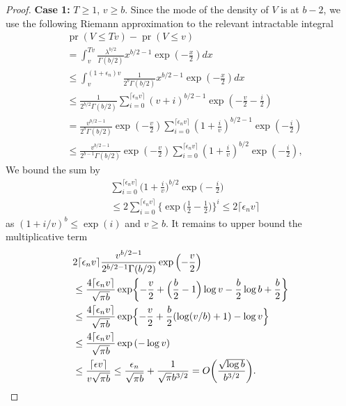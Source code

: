 \documentclass[10pt, reqno]{amsart}
\numberwithin{equation}{section}
\newcommand{\pr}{\mathop{\mathrm{pr}}}
\begin{document}
\begin{appendix}
\begin{proof}
	\noindent    \textbf{Case 1:} $T \geq 1$, $v \geq b$. Since the mode of the density of $V$ is at $b - 2$, we use the following Riemann approximation to the relevant intractable integral
	\begin{align*}
		&\pr\left( V \leq Tv \right) - \pr(V \leq v) 
		\\
		&= \int_{v}^{Tv} \frac{\lambda^{b/2}}{\Gamma(b/2)} x^{b/2-1} \exp\left( -\frac{x}{2} \right) dx    \\
		&\leq \int_{v}^{(1 +\epsilon_n)v} \frac{1}{2^b\Gamma(b/2)} x^{b/2-1} \exp\left( -\frac{x}{2} \right) dx\\
		&\leq \frac{1}{2^{b/2}\Gamma(b/2)} \sum^{ \lceil \epsilon_n v \rceil}_{  i = 0}  (v+i )^{b/2-1} \exp\left( -\frac{ v }{2} - \frac{i}{2} \right)\\
		&= \frac{v^{b/2-1}}{2^b\Gamma(b/2)} \exp\left( -\frac{ v }{2} \right) \sum^{ \lceil \epsilon_n v \rceil}_{  i = 0}  \left(1+ \frac{i}{v} \right)^{b/2-1} \exp\left(- \frac{i}{2} \right) \\
		&\leq \frac{v^{b/2-1}}{2^{b-1}\Gamma(b/2)} \exp\left( -\frac{ v }{2} \right) \sum^{ \lceil \epsilon_n v \rceil}_{  i = 0}  \left(1+ \frac{i}{v} \right)^{b/2} \exp\left(- \frac{i}{2} \right), 
	\end{align*}
	We bound the sum by
	\begin{align*}
		&\sum^{\lceil \epsilon_n v \rceil}_{  i = 0}  \biggl(1+ \frac{i}{v} \biggr)^{b/2} \exp\biggl(- \frac{i}{2} \biggr)\\
		&\leq 2 \sum^{\lceil \epsilon_n v \rceil}_{  i = 0} \biggl\{ \exp\biggl( \frac{1}{2} - \frac{1}{2} \biggr) \biggr\}^i  \leq 2\lceil \epsilon_n v \rceil
	\end{align*}
	as $(1 + i/v)^b \leq \exp(i)$ and $v \geq b$. It remains to upper bound the multiplicative term 
	\begin{align*}
		&2\lceil \epsilon_n v \rceil\frac{v^{b/2-1}}{2^{b/2-1}\Gamma(b/2)} \exp\left( -\frac{v}{2}\right)\\
		&\leq \frac{4\lceil \epsilon_n v \rceil}{\sqrt{\pi b}} \exp\biggl\{-\frac{v}{2} + \Bigl(\frac{b}{2} - 1\Bigr) \log v -\frac{b}{2}\log b + \frac{b}{2}\biggr\} \\
		&\leq \frac{4\lceil \epsilon_n v \rceil}{\sqrt{\pi b}} \exp\Bigl\{-\frac{v}{2} + \frac{b}{2} (\log(v/b) + 1)  - \log v\Bigr\}\\
		&\leq \frac{4\lceil \epsilon_n v \rceil}{\sqrt{\pi b}} \exp\left( - \log v \right)\\
		&\leq \frac{\lceil\epsilon v \rceil}{v \sqrt{\pi b}} \leq \frac{\epsilon_n }{\sqrt{\pi b}} + \frac{1 }{\sqrt{\pi} b^{3/2}} = O\biggl( \frac{\sqrt{\log b}}{b^{3/2}} \biggr).
	\end{align*}   
	

\end{proof}
\end{appendix}
\end{document}
